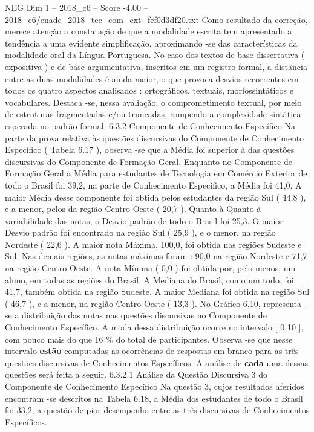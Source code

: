 \begin{textsample}{NEG Dim 1 – 2018\_c6 – Score -4.00 – 2018\_c6/enade\_2018\_tec\_com\_ext\_fef0d3df20.txt}
Como resultado da correção, merece atenção a constatação de que a modalidade escrita tem apresentado a tendência a uma evidente simplificação, aproximando -se das características da modalidade oral da Língua Portuguesa.
No caso dos textos de base dissertativa ( expositiva ) e de base argumentativa, inscritos em um registro formal, a distância entre as duas modalidades é ainda maior, o que provoca desvios recorrentes em todos os quatro aspectos analisados : ortográficos, textuais, morfossintáticos e vocabulares.
Destaca -se, nessa avaliação, o comprometimento textual, por meio de estruturas fragmentadas e/ou truncadas, rompendo a complexidade sintática esperada no padrão formal. 6.3.2 Componente de Conhecimento Específico Na parte da prova relativa às questões discursivas do Componente de Conhecimento Específico ( Tabela 6.17 ), observa -se que a Média foi superior à das questões discursivas do Componente de Formação Geral.
Enquanto no Componente de Formação Geral a Média para estudantes de Tecnologia em Comércio Exterior de todo o Brasil foi 39,2, na parte de Conhecimento Específico, a Média foi 41,0.
A maior Média desse componente foi obtida pelos estudantes da região Sul ( 44,8 ), e a menor, pelos da região Centro-Oeste ( 20,7 ).
Quanto à Quanto à variabilidade das notas, o Desvio padrão de todo o Brasil foi 25,3.
O maior Desvio padrão foi encontrado na região Sul ( 25,9 ), e o menor, na região Nordeste ( 22,6 ).
A maior nota Máxima, 100,0, foi obtida nas regiões Sudeste e Sul.
Nas demais regiões, as notas máximas foram : 90,0 na região Nordeste e 71,7 na região Centro-Oeste.
A nota Mínima ( 0,0 ) foi obtida por, pelo menos, um aluno, em todas as regiões do Brasil.
A Mediana do Brasil, como um todo, foi 41,7, também obtida na região Sudeste.
A maior Mediana foi obtida na região Sul ( 46,7 ), e a menor, na região Centro-Oeste ( 13,3 ).
No Gráfico 6.10, representa -se a distribuição das notas nas questões discursivas no Componente de Conhecimento Específico.
A moda dessa distribuição ocorre no intervalo [ 0 10 ], com pouco mais do que 16 \% do total de participantes.
Observa -se que nesse intervalo \textbf{estão} computadas as ocorrências de respostas em branco para as três questões discursivas de Conhecimentos Específicos.
A análise de \textbf{cada} uma dessas questões será feita a seguir. 6.3.2.1 Análise da Questão Discursiva 3 do Componente de Conhecimento Específico Na questão 3, cujos resultados aferidos encontram -se descritos na Tabela 6.18, a Média dos estudantes de todo o Brasil foi 33,2, a questão de pior desempenho entre as três discursivas de Conhecimentos Específicos.

\end{textsample}
